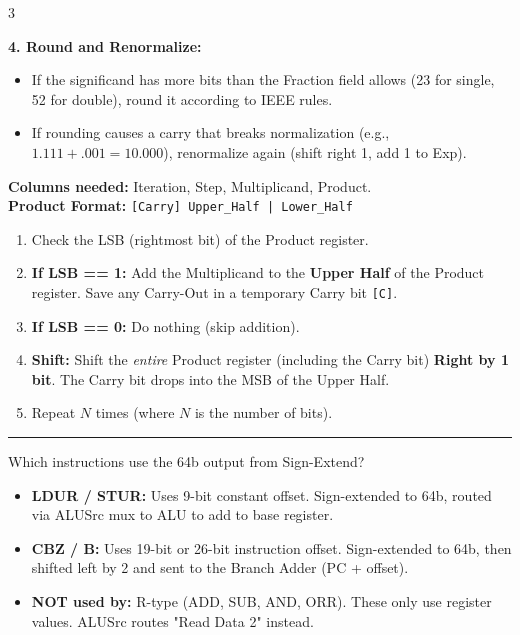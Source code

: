 \documentclass[8pt, letterpaper]{extarticle}
\newcommand{\sectionhead}[1]{%
    \vspace{1.5mm}{\small\bfseries\uppercase{#1}}\vspace{0.2mm}\hrule\vspace{0.5mm}%
}
\begin{document}
\begin{multicols}{3}
\begin{tcolorbox}[colback=yellow!5, colframe=black, boxrule=0.5pt, title=\textbf{Step-by-Step FP Addition}]
\textbf{4. Round and Renormalize:}
\begin{itemize}
    \item If the significand has more bits than the Fraction field allows (23 for single, 52 for double), round it according to IEEE rules.
    \item If rounding causes a carry that breaks normalization (e.g., $1.111 + .001 = 10.000$), renormalize again (shift right 1, add 1 to Exp).
\end{itemize}
\end{tcolorbox}

\begin{tcolorbox}[colback=blue!5, colframe=black, boxrule=0.5pt, title=\textbf{Optimized Multiply Trace Table Rules}]
\textbf{Columns needed:} Iteration, Step, Multiplicand, Product.\\
\textbf{Product Format:} \texttt{[Carry] Upper\_Half | Lower\_Half}
\begin{enumerate}
    \item Check the LSB (rightmost bit) of the Product register.
    \item \textbf{If LSB == 1:} Add the Multiplicand to the \textbf{Upper Half} of the Product register. Save any Carry-Out in a temporary Carry bit \texttt{[C]}.
    \item \textbf{If LSB == 0:} Do nothing (skip addition).
    \item \textbf{Shift:} Shift the \textit{entire} Product register (including the Carry bit) \textbf{Right by 1 bit}. The Carry bit drops into the MSB of the Upper Half.
    \item Repeat $N$ times (where $N$ is the number of bits).
\end{enumerate}
\end{tcolorbox}

\sectionhead{Sign-Extend Unit Usage}
Which instructions use the 64b output from Sign-Extend?
\begin{itemize}
    \item \textbf{LDUR / STUR:} Uses 9-bit constant offset. Sign-extended to 64b, routed via ALUSrc mux to ALU to add to base register.
    \item \textbf{CBZ / B:} Uses 19-bit or 26-bit instruction offset. Sign-extended to 64b, then shifted left by 2 and sent to the Branch Adder (PC + offset).
    \item \textbf{NOT used by:} R-type (ADD, SUB, AND, ORR). These only use register values. ALUSrc routes "Read Data 2" instead.
\end{itemize}


\end{multicols}
\end{document}
